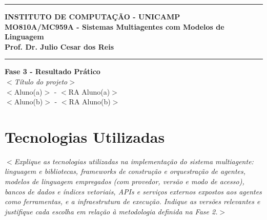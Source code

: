 \documentclass[12pt]{article}
\renewcommand{\headrulewidth}{0pt} %
\begin{document}
\vspace{5mm}
\hrule

\vspace{3mm}

\begin{center}
    {\large\textbf{INSTITUTO DE COMPUTAÇÃO - UNICAMP}} \\
    \vspace{3mm}
    {\large\textbf{MO810A/MC959A - Sistemas Multiagentes com Modelos de Linguagem}} \\
    \vspace{3mm}
    {\large\textbf{Prof. Dr. Julio Cesar dos Reis}}
\end{center}

\vspace{3mm}
\hrule

\vspace{2.5cm}
\begin{flushright}
    \Large{\textbf{Fase 3 - Resultado Prático}} \\
    \vspace{1cm}
    \textit{
        $<$Título do projeto$>$ \\
    }
    \vspace{5cm}
    $<$Aluno(a)$>$ - $<$RA Aluno(a)$>$ \\
    $<$Aluno(b)$>$ - $<$RA Aluno(b)$>$
\end{flushright}



\newpage
\pagestyle{fancy} %
\fancyhf{} %
\renewcommand{\headrulewidth}{0pt} %

\fancyfoot[R]{\thepage}



\section{Tecnologias Utilizadas}
\label{sec:tecnologias}

\textit{$<$Explique as tecnologias utilizadas na implementação do sistema multiagente: linguagem e bibliotecas, \textit{frameworks} de construção e orquestração de agentes, modelos de linguagem empregados (com provedor, versão e modo de acesso), bancos de dados e índices vetoriais, APIs e serviços externos expostos aos agentes como ferramentas, e a infraestrutura de execução. Indique as versões relevantes e justifique cada escolha em relação à metodologia definida na Fase 2.$>$}
\end{document}
